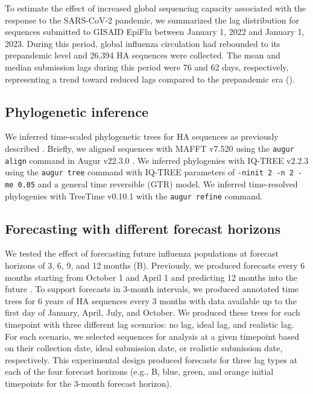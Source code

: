 \documentclass[9pt,lineno]{elife}
\begin{document}
To estimate the effect of increased global sequencing capacity associated with the response to the SARS-CoV-2 pandemic, we summarized the lag distribution for sequences submitted to GISAID EpiFlu between January 1, 2022 and January 1, 2023.
During this period, global influenza circulation had rebounded to its prepandemic level and 26,394 HA sequences were collected.
The mean and median submission lags during this period were 76 and 62 days, respectively, representing a trend toward reduced lags compared to the prepandemic era ().

\subsection{Phylogenetic inference}

We inferred time-scaled phylogenetic trees for HA sequences as previously described \citep{Huddleston2020}.
Briefly, we aligned sequences with MAFFT v7.520 \citep{Katoh2002,Katoh2013} using the \texttt{augur align} command in Augur v22.3.0 \citep{Huddleston2021}.
We inferred phylogenies with IQ-TREE v2.2.3 \citep{Nguyen2014} using the \texttt{augur tree} command with IQ-TREE parameters of \texttt{-ninit 2 -n 2 -me 0.05} and a general time reversible (GTR) model.
We inferred time-resolved phylogenies with TreeTime v0.10.1 \citep{Sagulenko2018} with the \texttt{augur refine} command.

\subsection{Forecasting with different forecast horizons}

We tested the effect of forecasting future influenza populations at forecast horizons of 3, 6, 9, and 12 months (B).
Previously, we produced forecasts every 6 months starting from October 1 and April 1 and predicting 12 months into the future \citep{Huddleston2020}.
To support forecasts in 3-month intervals, we produced annotated time trees for 6 years of HA sequences every 3 months with data available up to the first day of January, April, July, and October.
We produced these trees for each timepoint with three different lag scenarios: no lag, ideal lag, and realistic lag.
For each scenario, we selected sequences for analysis at a given timepoint based on their collection date, ideal submission date, or realistic submission date, respectively.
This experimental design produced forecasts for three lag types at each of the four forecast horizons (e.g., B, blue, green, and orange initial timepoints for the 3-month forecast horizon).
\end{document}
